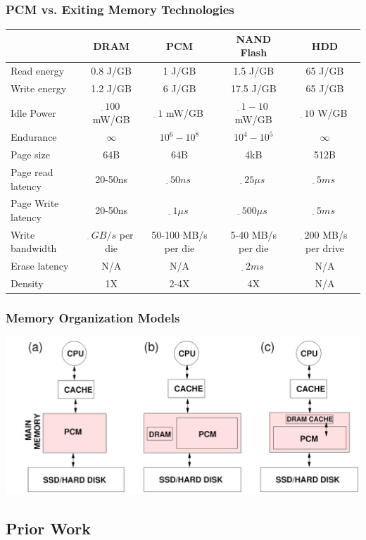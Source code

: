 \begin{frame}
\frametitle{PCM vs. Exiting Memory Technologies}

{\tiny
\begin{tabular}{|l|c|c|c|c|}
\hline
& DRAM & PCM & NAND Flash & HDD \\\hline
Read energy & 0.8 J/GB & 1 J/GB & 1.5 J/GB & 65 J/GB \\
Write energy & 1.2 J/GB & 6 J/GB & 17.5 J/GB & 65 J/GB \\
Idle Power & $_{\tilde{}}\,100$ mW/GB & $_{\tilde{}}\,1$ mW/GB & $_{\tilde{}}\,1-10$ mW/GB & $_{\tilde{}}\,10$ W/GB \\\hline
Endurance & $\infty$ & $10^6-10^8$ & $10^4-10^5$ & $\infty$ \\\hline
Page size & 64B & 64B & 4kB & 512B \\
Page read latency & 20-50ns & $_{\tilde{}}\,50ns$ & $_{\tilde{}}\,25\mu s$ & $_{\tilde{}}\,5 ms$ \\
Page Write latency & 20-50ns & $_{\tilde{}}\,1\mu s$ & $_{\tilde{}}\,500\mu s$ & $_{\tilde{}}\,5 ms$ \\
Write bandwidth & $_{\tilde{}}\,GB/s$ per die & 50-100 MB/s per die & 5-40 MB/s per die & $_{\tilde{}}\,200$ MB/s per drive \\
Erase latency & N/A & N/A & $_{\tilde{}}\,2ms$ & N/A \\\hline
Density & 1X & 2-4X & 4X & N/A \\\hline
\end{tabular}
}
\end{frame}



\begin{frame}
\frametitle{Memory Organization Models}

\includegraphics[scale=0.3]{images/memoryorganization.png}
\end{frame}


\subsection{Prior Work}


